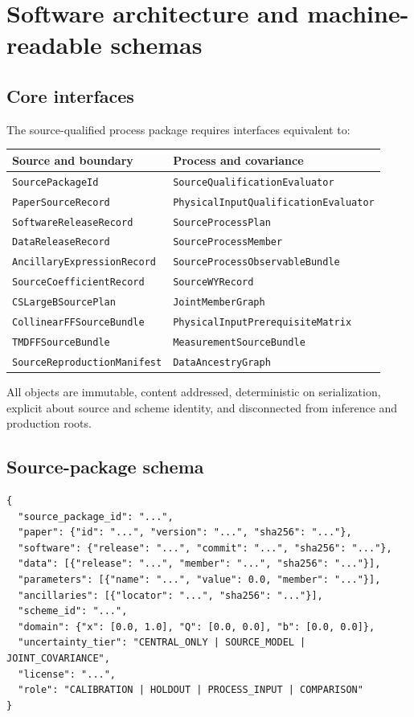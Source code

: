 \documentclass[11pt]{article}
\begin{document}
\section{Software architecture and machine-readable schemas}
\label{sec:software}

\subsection{Core interfaces}

The source-qualified process package requires interfaces equivalent to:
\begin{center}
\begin{tabularx}{0.94\textwidth}{YY}
\toprule
Source and boundary & Process and covariance\\
\midrule
\texttt{SourcePackageId} & \texttt{SourceQualificationEvaluator}\\
\texttt{PaperSourceRecord} & \texttt{PhysicalInputQualificationEvaluator}\\
\texttt{SoftwareReleaseRecord} & \texttt{SourceProcessPlan}\\
\texttt{DataReleaseRecord} & \texttt{SourceProcessMember}\\
\texttt{AncillaryExpressionRecord} & \texttt{SourceProcessObservableBundle}\\
\texttt{SourceCoefficientRecord} & \texttt{SourceWYRecord}\\
\texttt{CSLargeBSourcePlan} & \texttt{JointMemberGraph}\\
\texttt{CollinearFFSourceBundle} & \texttt{PhysicalInputPrerequisiteMatrix}\\
\texttt{TMDFFSourceBundle} & \texttt{MeasurementSourceBundle}\\
\texttt{SourceReproductionManifest} & \texttt{DataAncestryGraph}\\
\bottomrule
\end{tabularx}
\end{center}

All objects are immutable, content addressed, deterministic on serialization, explicit about source and scheme identity, and disconnected from inference and production roots.

\subsection{Source-package schema}

\begin{verbatim}
{
  "source_package_id": "...",
  "paper": {"id": "...", "version": "...", "sha256": "..."},
  "software": {"release": "...", "commit": "...", "sha256": "..."},
  "data": [{"release": "...", "member": "...", "sha256": "..."}],
  "parameters": [{"name": "...", "value": 0.0, "member": "..."}],
  "ancillaries": [{"locator": "...", "sha256": "..."}],
  "scheme_id": "...",
  "domain": {"x": [0.0, 1.0], "Q": [0.0, 0.0], "b": [0.0, 0.0]},
  "uncertainty_tier": "CENTRAL_ONLY | SOURCE_MODEL | JOINT_COVARIANCE",
  "license": "...",
  "role": "CALIBRATION | HOLDOUT | PROCESS_INPUT | COMPARISON"
}
\end{verbatim}
\end{document}
